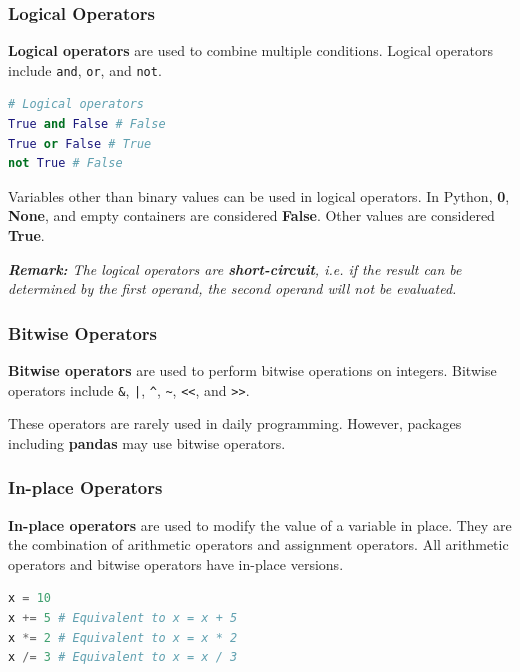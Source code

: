 \documentclass[beamer, en, version=2.0]{huangfusl-template}
\begin{document}
    \begin{frame}[fragile]
        \frametitle{Logical Operators}

        \textbf{Logical operators} are used to combine multiple conditions. Logical operators include {\footnotesize\verb|and|}, {\footnotesize\verb|or|}, and {\footnotesize\verb|not|}.

\begin{lstlisting}[language=python]
# Logical operators
True and False # False
True or False # True
not True # False
\end{lstlisting}

        Variables other than binary values can be used in logical operators. In Python, \textbf{0}, \textbf{None}, and empty containers are considered \textbf{False}. Other values are considered \textbf{True}.

        {\footnotesize\itshape\textbf{Remark:} The logical operators are \textbf{short-circuit}, i.e. if the result can be determined by the first operand, the second operand will not be evaluated.}
    \end{frame}
    \begin{frame}[fragile]
        \frametitle{Bitwise Operators}

        \textbf{Bitwise operators} are used to perform bitwise operations on integers. Bitwise operators include {\footnotesize\verb|&|}, {\footnotesize\verb+|+}, {\footnotesize\verb|^|}, {\footnotesize\verb|~|}, {\footnotesize\verb|<<|}, and {\footnotesize\verb|>>|}.

        These operators are rarely used in daily programming. However, packages including \textbf{pandas} may use bitwise operators.
    \end{frame}
    \begin{frame}[fragile]
        \frametitle{In-place Operators}

        \textbf{In-place operators} are used to modify the value of a variable in place. They are the combination of arithmetic operators and assignment operators. All arithmetic operators and bitwise operators have in-place versions.

\begin{lstlisting}[language=python]
x = 10
x += 5 # Equivalent to x = x + 5
x *= 2 # Equivalent to x = x * 2
x /= 3 # Equivalent to x = x / 3
\end{lstlisting}
    \end{frame}
\end{document}

